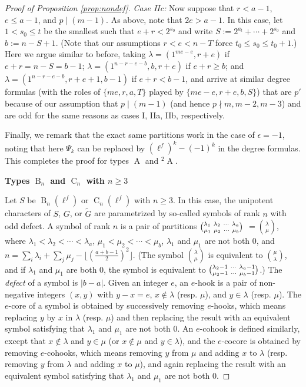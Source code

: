 \documentclass[12pt,leqno,a4paper]{amsart}
\newcommand{\tw}[1]{{}^#1\!}
\theoremstyle{remark}
\newcommand\wt[1]{\widetilde{#1}}
\newcommand\type[1]{\operatorname{#1}}
\begin{document}
\begin{proof}[Proof of Proposition \ref{prop:nondef}]
\emph{Case IIc:} Now suppose that $r<a-1$, $e\leq a-1$, and $p\mid (m-1)$.  As above, note that $2e>a-1$.  In this case, let $1< s_0\leq t$ be the smallest such that $e+r< 2^{s_0}$ and write $S:=2^{a_t}+\cdots+2^{s_0}$ and $b:=n-S+1$. (Note that our assumptions $r<e<n-T$ force $t_0\leq s_0\leq t_0+1$.)  Here we argue similar to before, taking $\lambda=(1^{me-e}, r+e)$ if $e+r=n-S=b-1$; $\lambda=(1^{n-r-e-b}, b, r+e)$ if $e+r\geq b$; and $\lambda=(1^{n-r-e-b}, r+e+1, b-1)$ if $e+r<b-1$, and arrive at similar degree formulas (with the roles of $\{me, r, a, T\}$ played by $\{me-e, r+e, b, S\}$) that are $p'$ because of our assumption that $p\mid(m-1)$ (and hence $p\nmid m, m-2, m-3$) and are odd for the same reasons as cases I, IIa, IIb, respectively.

\medskip


\medskip

Finally, we remark that the exact same partitions work in the case of $\epsilon=-1$, noting that here $\Psi_k$ can be replaced by $(\ell^f)^k-(-1)^k$ in the degree formulas.  This completes the proof for types $\type{A}$ and $\tw{2}\type{A}$.

\bigskip

\noindent\textbf{Types $\type{B}_n$ and $\type{C}_n$ with $n\geq 3$}

Let $S$ be $\type{B}_n(\ell^f)$ or $\type{C}_n(\ell^f)$ with $n\geq 3$.  
In this case, the unipotent characters of $S$, $G$, or $\wt{G}$ are parametrized by so-called symbols of rank $n$ with odd defect.  A symbol of rank $n$ is a pair of partitions $ {\lambda_1\hbox{ } \lambda_2\hbox{ } \cdots\hbox{ } \lambda_a} \choose {\mu_1\hbox{ } \mu_2\hbox{ } \cdots\hbox{ } \mu_b}$ $ = {\lambda\choose\mu}$, where $\lambda_1<\lambda_2<\cdots<\lambda_a$, $\mu_1<\mu_2<\cdots<\mu_b$, $\lambda_1$ and $\mu_1$ are not both $0$, and $n=\sum_i \lambda_i+\sum_j \mu_j - \lfloor{\left(\frac{a+b-1}{2}\right)^2}\rfloor$.  (The symbol $\lambda\choose\mu$ is equivalent to $\mu\choose\lambda$, and if $\lambda_1$ and $\mu_1$ are both $0$, the symbol is equivalent to $ \lambda_2-1\hbox{ } \cdots\hbox{ } \lambda_a-1 \choose  \mu_2-1\hbox{ } \cdots\hbox{ } \mu_b-1$.)  The \emph{defect} of a symbol is $|b-a|$. Given an integer $e$, an $e$-hook is a pair of non-negative integers $(x, y)$ with $y-x=e$, $x\not\in\lambda$ (resp. $\mu$), and $y\in \lambda$ (resp. $\mu$).  The $e$-core of a symbol is obtained by successively removing $e$-hooks, which means replacing $y$ by $x$ in $\lambda$ (resp. $\mu$) and then replacing the result with an equivalent symbol satisfying that $\lambda_1$ and $\mu_1$ are not both $0$. An $e$-cohook is defined similarly, except that $x\not\in\lambda$ and $y\in\mu$ (or $x\not\in\mu$ and $y\in\lambda$), and the $e$-cocore is obtained by removing $e$-cohooks, which means removing $y$ from $\mu$ and adding $x$ to $\lambda$ (resp. removing $y$ from $\lambda$ and adding $x$ to $\mu$), and again replacing the result with an equivalent symbol satisfying that $\lambda_1$ and $\mu_1$ are not both $0$.


\end{proof}
\end{document}
